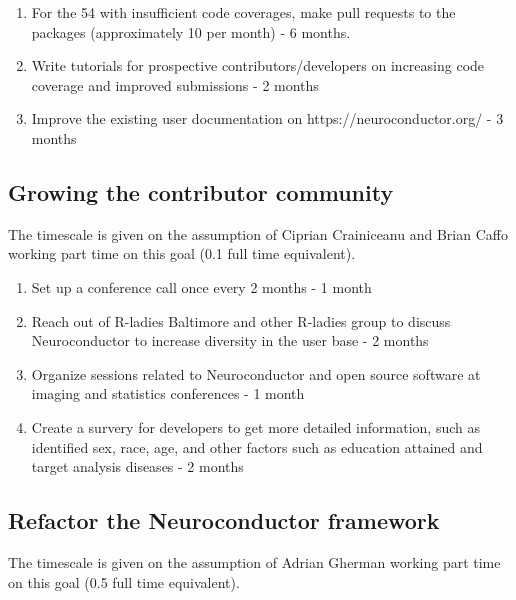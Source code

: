 \documentclass[]{elsarticle} %
\providecommand{\tightlist}{%
  \setlength{\itemsep}{0pt}\setlength{\parskip}{0pt}}
\begin{document}
\begin{enumerate}
\def\labelenumi{\arabic{enumi}.}
\tightlist
\item
  For the 54 with insufficient code coverages, make pull requests to the packages (approximately 10 per month) - 6 months.\\
\item
  Write tutorials for prospective contributors/developers on increasing code coverage and improved submissions - 2 months
\item
  Improve the existing user documentation on https://neuroconductor.org/ - 3 months
\end{enumerate}

\hypertarget{growing-the-contributor-community-1}{%
\subsection{Growing the contributor community}\label{growing-the-contributor-community-1}}

The timescale is given on the assumption of Ciprian Crainiceanu and Brian Caffo working part time on this goal (0.1 full time equivalent).

\begin{enumerate}
\def\labelenumi{\arabic{enumi}.}
\tightlist
\item
  Set up a conference call once every 2 months - 1 month
\item
  Reach out of R-ladies Baltimore and other R-ladies group to discuss Neuroconductor to increase diversity in the user base - 2 months
\item
  Organize sessions related to Neuroconductor and open source software at imaging and statistics conferences - 1 month
\item
  Create a survery for developers to get more detailed information, such as identified sex, race, age, and other factors such as education attained and target analysis diseases - 2 months
\end{enumerate}

\hypertarget{refactor-the-neuroconductor-framework-1}{%
\subsection{Refactor the Neuroconductor framework}\label{refactor-the-neuroconductor-framework-1}}

The timescale is given on the assumption of Adrian Gherman working part
time on this goal (0.5 full time equivalent).
\end{document}
